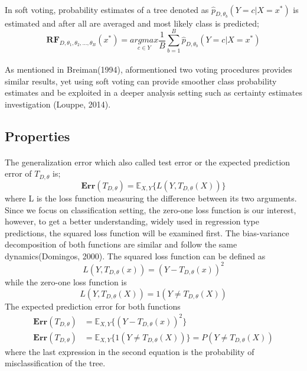 \paragraph{}
In soft voting, probability estimates of a tree denoted as $\hat{p}_{D, \theta_{b}} (Y = c | X = x^*)$ is estimated and after all are averaged and most likely class is predicted;
\begin{equation}
\boldsymbol{RF}_{D, \theta_{1}, \theta_{2}, ..., \theta_{B}} (x^*) =
	\underset{c \in Y}{argmax} \dfrac{1}{B}\sum_{b = 1}^{B}{\hat{p}_{D, \theta_{b}} (Y = c | X = x^*)}
\end{equation}

\paragraph{}
As mentioned in Breiman(1994), aformentioned two voting procedures provides similar results, yet using soft voting can provide smoother class probability estimates and be exploited in a deeper analysis setting such as certainty estimates investigation (Louppe, 2014). 

\subsection{Properties}
\paragraph{}
The generalization error which also called test error or the expected prediction error of $T_{D,\theta}$ is;
\begin{equation}
\boldsymbol{Err}(T_{D,\theta}) = \mathbb{E}_{X,Y}\{L(Y, T_{D,\theta}(X)) \}
\end{equation}
where L is the loss function measuring the difference between its two arguments. Since we focus on classification setting, the zero-one loss function is our interest, however, to get a better understanding, widely used in regression type predictions, the squared loss function will be examined first. The bias-variance decomposition of both functions are similar and follow the same dynamics(Domingos, 2000). The squared loss function can be defined as
\begin{equation}
L(Y, T_{D, \theta}(x)) = (Y - T_{D, \theta}(x))^2
\end{equation}
while the zero-one loss function is
\begin{equation}
L(Y, T_{D,\theta}(X)) = 1 (Y \neq T_{D, \theta}(X))
\end{equation}
The expected prediction error for both functions 
\begin{align}
\boldsymbol{Err}(T_{D,\theta}) & = \mathbb{E}_{X,Y}\{ (Y - T_{D, \theta}(x))^2 \} \\
\boldsymbol{Err}(T_{D,\theta}) & = \mathbb{E}_{X,Y}\{ 1(Y \neq T_{D, \theta}(X)) \}
= P(Y \neq T_{D, \theta}(X))
\end{align}
where the last expression in the second equation is the probability of misclassification of the tree.
